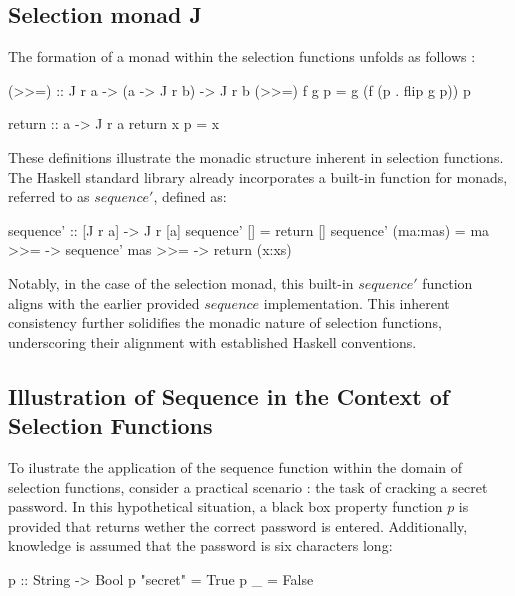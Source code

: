 \documentclass[runningheads]{llncs}
\begin{document}
\subsection{Selection monad J}\label{selection-monad-j}

The formation of a monad within the selection functions unfolds as
follows \cite{escardo2010selection}:

\begin{code}
(>>=) :: J r a -> (a -> J r b) -> J r b
(>>=) f g p = g (f (p . flip g p)) p
\end{code}

\begin{code}
return :: a -> J r a
return x p = x
\end{code}

These definitions illustrate the monadic structure inherent in selection
functions. The Haskell standard library already incorporates a built-in
function for monads, referred to as \(sequence'\), defined as:

\begin{code}
sequence' :: [J r a] -> J r [a]
sequence' []     = return []
sequence' (ma:mas) = ma >>= 
                    \x -> sequence' mas >>= 
                    \xs -> return (x:xs)
\end{code}

Notably, in the case of the selection monad, this built-in \(sequence'\)
function aligns with the earlier provided \(sequence\) implementation.
This inherent consistency further solidifies the monadic nature of
selection functions, underscoring their alignment with established
Haskell conventions.

\subsection{Illustration of Sequence in the Context of Selection
Functions}\label{illustration-of-sequence-in-the-context-of-selection-functions}

To ilustrate the application of the sequence function within the domain
of selection functions, consider a practical scenario
\cite{hartmann2022algorithm}: the task of cracking a secret password. In
this hypothetical situation, a black box property function \(p\) is
provided that returns wether the correct password is entered.
Additionally, knowledge is assumed that the password is six characters
long:

\begin{code}
p :: String -> Bool
p "secret" = True
p _        = False
\end{code}
\end{document}
